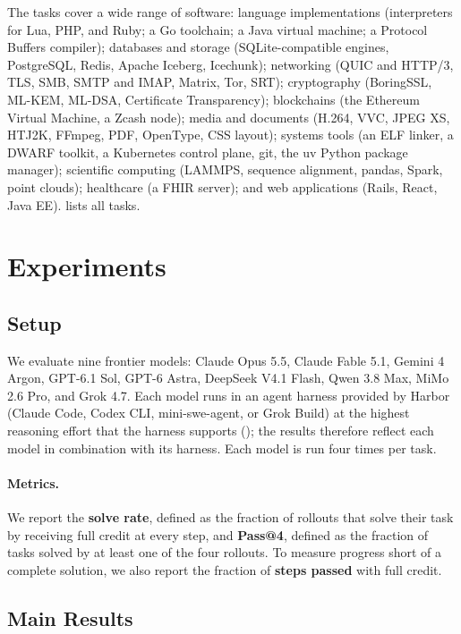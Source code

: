 \documentclass{article}
\begin{document}
The tasks cover a wide range of software:
language implementations (interpreters for Lua, PHP, and Ruby; a Go toolchain;
a Java virtual machine; a Protocol Buffers compiler);
databases and storage (SQLite-compatible engines, PostgreSQL, Redis, Apache Iceberg,
Icechunk);
networking (QUIC and HTTP/3, TLS, SMB, SMTP and IMAP, Matrix, Tor, SRT);
cryptography (BoringSSL, ML-KEM, ML-DSA, Certificate Transparency);
blockchains (the Ethereum Virtual Machine, a Zcash node);
media and documents (H.264, VVC, JPEG XS, HTJ2K, FFmpeg, PDF, OpenType, CSS layout);
systems tools (an ELF linker, a DWARF toolkit, a Kubernetes control plane,
git, the uv Python package manager);
scientific computing (LAMMPS, sequence alignment, pandas, Spark, point clouds);
healthcare (a FHIR server);
and web applications (Rails, React, Java EE).
 lists all tasks.

\section{Experiments}
\label{sec:experiment}

\subsection{Setup}
\label{sec:rollout-setup}

We evaluate nine frontier models: Claude Opus 5.5, Claude Fable 5.1, Gemini 4
Argon, GPT-6.1 Sol, GPT-6 Astra, DeepSeek V4.1 Flash, Qwen 3.8 Max, MiMo 2.6
Pro, and Grok 4.7. Each model runs in an agent harness provided by Harbor
(Claude Code, Codex CLI, mini-swe-agent, or Grok Build) at the highest
reasoning effort that the harness supports (); the results
therefore reflect each model in combination with its harness. Each model is run
four times per task.

\paragraph{Metrics.}
We report the \textbf{solve rate}, defined as the fraction of rollouts that
solve their task by receiving full credit at every step, and \textbf{Pass@4}, defined as the fraction of
tasks solved by at least one of the four rollouts. To measure progress short of
a complete solution, we also report the fraction of \textbf{steps passed} with
full credit.

\subsection{Main Results}
\label{sec:main-results}
\end{document}
